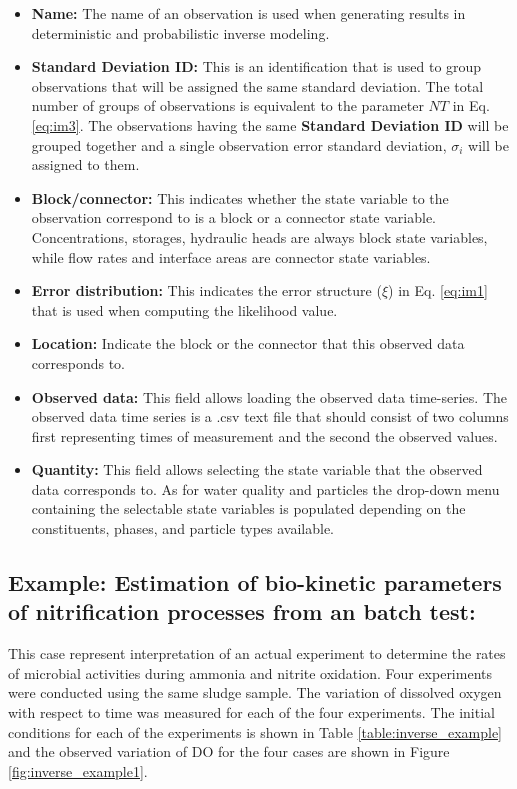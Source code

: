 \begin{itemize}
    \item \textbf{Name: } The name of an observation is used when generating results in deterministic and probabilistic inverse modeling. 
    \item \textbf{Standard Deviation ID: } This is an identification that is used to group observations that will be assigned the same standard deviation. The total number of groups of observations is equivalent to the parameter $NT$ in Eq. \ref{eq:im3}. The observations having the same \textbf{Standard Deviation ID} will be grouped together and a single observation error standard deviation, $\sigma_i$ will be assigned to them. 
    \item \textbf{Block/connector: } This indicates whether the state variable to the observation correspond to is a block or a connector state variable. Concentrations, storages, hydraulic heads are always block state variables, while flow rates and interface areas are connector state variables. 
    \item \textbf{Error distribution: } This indicates the error structure ($\xi$) in Eq. \ref{eq:im1} that is used when computing the likelihood value.
    \item \textbf{Location: } Indicate the block or the connector that this observed data corresponds to. 
    \item \textbf{Observed data: } This field allows loading the observed data time-series. The observed data time series is a .csv text file that should consist of two columns first representing times of measurement and the second the observed values. 
    \item \textbf{Quantity: } This field allows selecting the state variable that the observed data corresponds to. As for water quality and particles the drop-down menu containing the selectable state variables is populated depending on the constituents, phases, and particle types available. 
    
\end{itemize}
\subsection{Example: Estimation of bio-kinetic parameters of nitrification processes from an batch test: }
This case represent interpretation of an actual experiment to determine the rates of microbial activities during ammonia and nitrite oxidation. Four experiments were conducted using the same sludge sample. The variation of dissolved oxygen with respect to time was measured for each of the four experiments. The initial conditions for each of the experiments is shown in Table \ref{table:inverse_example} and the observed variation of DO for the four cases are shown in Figure \ref{fig:inverse_example1}. 

